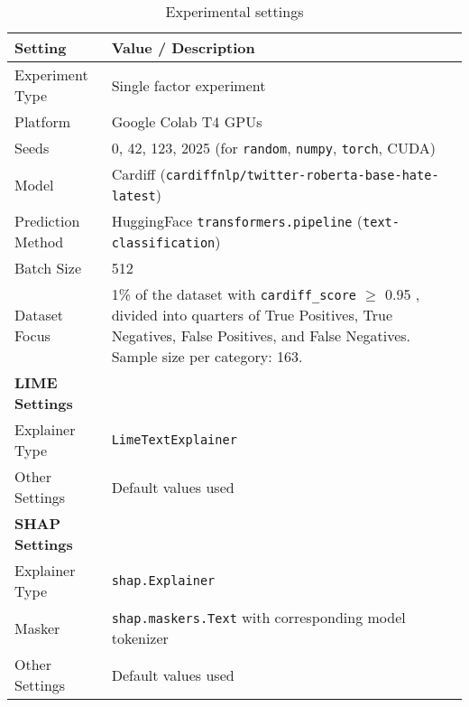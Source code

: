 \documentclass{article}
\begin{document}
\begin{table}[ht]
\centering
\caption{Experimental settings}
\label{tab:experimental_settings_pdf}
\begin{tabularx}{\textwidth}{lX}
\toprule
\textbf{Setting} & \textbf{Value / Description} \\
\midrule
Experiment Type & Single factor experiment \\
Platform & Google Colab T4 GPUs \\
Seeds & 0, 42, 123, 2025 (for \texttt{random}, \texttt{numpy}, \texttt{torch}, CUDA) \\
Model & Cardiff (\texttt{cardiffnlp/twitter-roberta-base-hate-latest}) \\
Prediction Method & HuggingFace \texttt{transformers.pipeline} (\texttt{text-classification}) \\
Batch Size & 512 \\
Dataset Focus & 1\% of the dataset with \texttt{cardiff\_score} $\geq$ 0.95 , divided into quarters of True Positives, True Negatives, False Positives, and False Negatives. Sample size per category: 163. \\

\midrule
\textbf{LIME Settings} & \\
\quad Explainer Type & \texttt{LimeTextExplainer} \\
\quad Other Settings & Default values used \\
\midrule
\textbf{SHAP Settings} & \\
\quad Explainer Type & \texttt{shap.Explainer} \\
\quad Masker & \texttt{shap.maskers.Text} with corresponding model tokenizer \\
\quad Other Settings & Default values used \\
\bottomrule
\end{tabularx}
\end{table}
\end{document}
